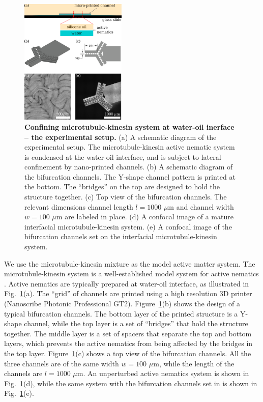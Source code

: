 \documentclass[%
10pt,
superscriptaddress,
twocolumn,
 amsmath,amssymb,
 aps,prx,
]{revtex4-2}
\begin{document}
\begin{figure}[!h]
    \includegraphics[width=0.45\textwidth]{2-bifurcation-experiment}
    \caption{
    \textbf{Confining microtubule-kinesin system at water-oil inerface -- the experimental setup.}
    (a) A schematic diagram of the experimental setup. 
    The microtubule-kinesin active nematic system is condensed at the water-oil interface, and is subject to lateral confinement by nano-printed channels. 
    (b) A schematic diagram of the bifurcation channels. 
    The Y-shape channel pattern is printed at the bottom.
    The ``bridges'' on the top are designed to hold the structure together. 
    (c) Top view of the bifurcation channels. 
    The relevant dimensions channel length $l=1000$ $\mu$m and channel width $w=100$ $\mu$m are labeled in place. 
    (d) A confocal image of a mature interfacial microtubule-kinesin system. 
    (e) A confocal image of the bifurcation channels set on the interfacial microtubule-kinesin system. 
    }
    \label{fig:bifurcation-experiment}
\end{figure}

We use the microtubule-kinesin mixture as the model active matter system. 
The microtubule-kinesin system is a well-established model system for active nematics \cite{Sanchez2012,Keber2014,Decamp2015,Hardouin2020}.
Active nematics are typically prepared at water-oil interface, as illustrated in Fig.~\ref{fig:bifurcation-experiment}(a). 
The ``grid'' of channels are printed using a high resolution 3D printer (Nanoscribe Photonic Professional GT2).
Figure~\ref{fig:bifurcation-experiment}(b) shows the design of a typical bifurcation channels.
The bottom layer of the printed structure is a Y-shape channel, while the top layer is a set of ``bridges'' that hold the structure together.
The middle layer is a set of spacers that separate the top and bottom layers, which prevents the active nematics from being affected by the bridges in the top layer.
Figure~\ref{fig:bifurcation-experiment}(c) shows a top view of the bifurcation channels.
All the three channels are of the same width $w=100$ $\mu$m, while the length of the channels are $l=1000$ $\mu$m.
An unperturbed active nematics system is shown in Fig.~\ref{fig:bifurcation-experiment}(d), while the same system with the bifurcation channels set in is shown in Fig.~\ref{fig:bifurcation-experiment}(e).
\end{document}
